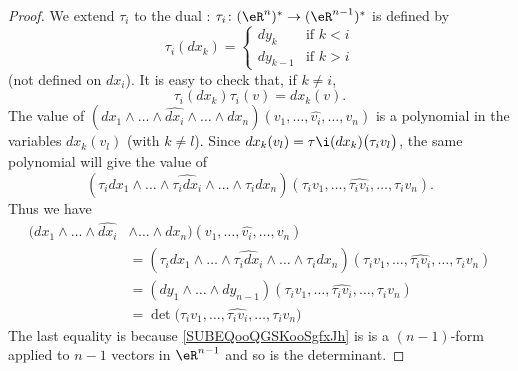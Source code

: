 \begin{proof}
	We extend \( \tau_i\) to the dual : \( \tau_i\colon(\eR^n)^*  \to (\eR^{n-1})^*\) is defined by
	\begin{equation}
		\tau_i(dx_k)=\begin{cases}
			dy_k     & \text{if } k<i \\
			dy_{k-1} & \text{if } k>i
		\end{cases}
	\end{equation}
	(not defined on \( dx_i\)). It is easy to check that, if \( k\neq i\),
	\begin{equation}
		\tau_i(dx_k)\tau_i(v)=dx_k(v).
	\end{equation}
	The value of  $(dx_1\wedge\ldots\wedge\widehat{dx_i}\wedge\ldots\wedge dx_n)(v_1,\ldots, \widehat{v_i},\ldots, v_n)$ is a polynomial in the variables \( dx_k(v_l)\) (with \( k\neq l\)). Since \( dx_k(v_l)=\tau\i(dx_k)\big( \tau_iv_l \big)\), the same polynomial will give the value of
	\begin{equation}
		(\tau_idx_1\wedge\ldots\wedge \widehat{\tau_idx_i}\wedge\ldots\wedge \tau_idx_n  )(\tau_i v_1,\ldots, \widehat{\tau_iv_i},\ldots, \tau_iv_n).
	\end{equation}
	Thus we have
	\begin{subequations}
		\begin{align}
			(dx_1\wedge\ldots\wedge\widehat{dx_i} & \wedge\ldots\wedge dx_n)(v_1,\ldots, \widehat{v_i},\ldots, v_n)                                                                               \\
			                                      & =(\tau_idx_1\wedge\ldots\wedge \widehat{\tau_idx_i}\wedge\ldots\wedge \tau_idx_n  )(\tau_i v_1,\ldots, \widehat{\tau_iv_i},\ldots, \tau_iv_n) \\
			                                      & =(dy_1\wedge\ldots\wedge dy_{n-1})(\tau_iv_1,\ldots,\widehat{\tau_iv_i},\ldots, \tau_iv_n) \label{SUBEQooQGSKooSgfxJh}                        \\
			                                      & =\det\big( \tau_iv_1,\ldots, \widehat{\tau_i v_i},\ldots, \tau_iv_n \big)
		\end{align}
	\end{subequations}
	The last equality is because \eqref{SUBEQooQGSKooSgfxJh} is is a \( (n-1)\)-form applied to \( n-1\) vectors in \( \eR^{n-1}\) and so is the determinant.
\end{proof}

